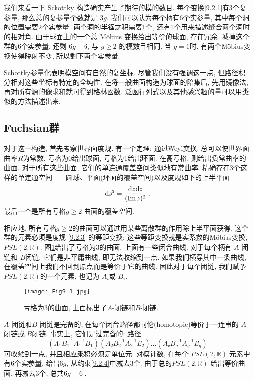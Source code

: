我们来看一下 Schottky 构造确实产生了期待的模的数目. 每个变换\eqref{9.2.1}有3个复参量, 那么总的复参量个数就是 $3 g$. 
我们可以认为每个柄有6个实参量, 其中每个洞的位置需要2个实参量. 两个洞的半径之积需要1个, 还有1个用来描述缝合两个洞时的相对角. 
由于球面上的一个总 Möbius 变换给出等价的球面, 存在冗余. 减掉这个群的6个实参量, 还剩 $6 g-6$, 与 $g \geq 2$ 的模数目相同. 
当 $g=1$时, 有两个Möbius变换使得映射不变, 所以剩下两个实参量.

Schottky参量化表明模空间有自然的复坐标. 尽管我们没有强调这一点, 但路径积分相对这些坐标有特定的全纯性. 
在将一般曲面构造为球面的陪集后, 先用镜像法, 再对所有源的像求和就可得到格林函数. 泛函行列式以及其他感兴趣的量可以用类似的方法描述出来.

\subsection*{Fuchsian群}

对于这一构造, 首先考察世界面度规. 有一个定理: 通过Weyl变换, 总可以使世界面曲率$R$为常数. 亏格为0给出球面, 亏格为1给出环面. 
在高亏格, 则给出负常曲率的曲面. 对于所有这些曲面, 它们的单连通覆盖空间类似地有常曲率. 精确存在3个这样的单连通空间——圆球、平面(环面的覆盖空间)以及度规如下的上半平面
\begin{equation}
	\mathrm{d} s^{2}=\frac{\mathrm{d} z \mathrm{d} \bar{z}}{(\operatorname{Im} z)^{2}} \:. \label{9.2.3}
\end{equation}
最后一个是所有亏格$g \geq 2$ 曲面的覆盖空间.

相应地, 所有亏格$g \geq 2$的曲面可以通过用某些离散群的作用除上半平面获得. 这个群的元素必须是度规 \eqref{9.2.3} 的等距变换; 
这些等距变换就是实系数的Möbius变换, $PSL(2, \mathds{R})$. 图\ref{Fig9.1}给出了亏格为3的曲面, 上面有一些闭合曲线. 对于每个柄有 $A$ 闭链和 $B$闭链. 
它们是非平庸曲线, 即无法收缩到一点. 如果我们横穿其中一条曲线, 在覆盖空间上我们不回到原点而是等价于它的曲线. 
因此对于每个闭链, 我们赋予 $PSL(2, \mathds{R})$的一个元素, 也记为 $A_{i}$或 $B_{i}$.

\begin{figure}
	\begin{center}
		\texttt{[image: Fig9.1.jpg]}\\
		\caption{亏格为3的曲面, 上面标出了$A$-闭链和$B$-闭链.}\label{Fig9.1}
	\end{center}
\end{figure}


$A$-闭链和$B$-闭链是完备的, 在每个闭合路径都同伦(homotopic)等价于一连串的 $A$ 闭链或 $B$闭链. 事实上, 它们是过完备的: 路径
\begin{equation}
	(A_{1} B_{1}^{-1} A_{1}^{-1} B_{1})(A_{2} B_{2}^{-1} A_{2}^{-1} B_{2}) \ldots(A_{g} B_{g}^{-1} A_{g}^{-1} B_{g}) \label{9.2.4}
\end{equation}
可收缩到一点, 并且相应乘积必须是单位元. 对模计数, 在每个 $PSL(2, \mathds{R})$ 元素中有6个实参量, 给出$6g$, 从约束\eqref{9.2.4}中减去3个, 
由于总的$PSL(2, \mathds{R})$ 给出等价曲面, 再减去3个, 总共$6g-6$ .

